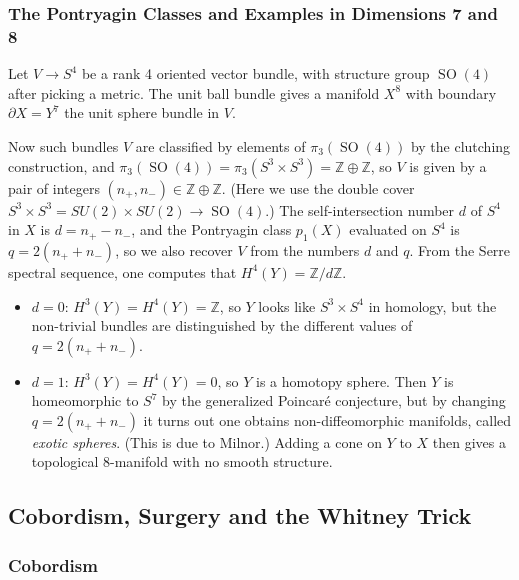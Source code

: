\documentclass{article}
\theoremstyle{definition}
\DeclareMathOperator{\SO}{SO}
\newcommand{\Z}{\mathbb{Z}}
\begin{document}
\subsubsection*{The Pontryagin Classes and Examples in Dimensions 7 and 8}

Let $V\to S^4$ be a rank 4 oriented vector bundle, with structure group $\SO(4)$
after picking a metric. The unit ball bundle gives a manifold $X^8$ with
boundary $\partial X=Y^7$ the unit sphere bundle in $V$.

Now such bundles $V$ are classified by elements of $\pi_3(\SO(4))$ by the
clutching construction, and $\pi_3(\SO(4))=\pi_3(S^3\times S^3)=\Z\oplus\Z$, so
$V$ is given by a pair of integers $(n_+,n_-)\in\Z\oplus\Z$. (Here we use the
double cover $S^3\times S^3=SU(2)\times SU(2)\to\SO(4)$.) The self-intersection
number $d$ of $S^4$ in $X$ is $d=n_+-n_-$, and the Pontryagin class $p_1(X)$
evaluated on $S^4$ is $q=2(n_++n_-)$, so we also recover $V$ from the numbers
$d$ and $q$. From the Serre spectral sequence, one computes that
$H^4(Y)=\Z/d\Z$.
\begin{itemize}
    \item $d=0$: $H^3(Y)=H^4(Y)=\Z$, so $Y$ looks like $S^3\times S^4$ in
        homology, but the non-trivial bundles are distinguished by the different
        values of $q=2(n_++n_-)$.

    \item $d=1$: $H^3(Y)=H^4(Y)=0$, so $Y$ is a homotopy sphere. Then $Y$ is
        homeomorphic to $S^7$ by the generalized Poincar\'e conjecture, but by
        changing $q=2(n_++n_-)$ it turns out one obtains non-diffeomorphic
        manifolds, called \emph{exotic spheres}. (This is due to Milnor.) Adding
        a cone on $Y$ to $X$ then gives a topological 8-manifold with no smooth
        structure.
\end{itemize}

\subsection*{Cobordism, Surgery and the Whitney Trick}

\subsubsection*{Cobordism}
\end{document}
